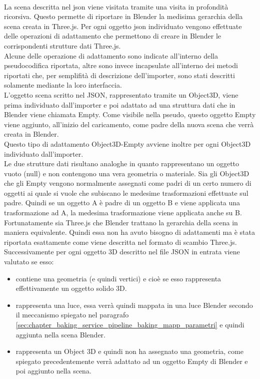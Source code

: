 \\
La scena descritta nel json viene visitata tramite una visita in profondità ricorsiva. 
Questo permette di riportare in Blender la medisima gerarchia della scena creata in Three.js.
Per ogni oggetto json individuato vengono effettuate delle operazioni di adattamento che permettono di creare in Blender le corrispondenti strutture dati Three.js.
\\
Alcune delle operazione di adattamento sono indicate all’interno della pseudocodifica riportata, altre sono invece incapsulate all’interno dei metodi riportati che, per semplifità di descrizione dell’importer, sono stati descritti solamente mediante la loro interfaccia.
\\
L’oggetto scena scritto nel JSON, rappresentato  tramite un Object3D, viene prima individuato dall’importer e poi  adattato ad una struttura dati che in Blender viene chiamata Empty. 
Come visibile nella pseudo, questo oggetto Empty viene aggiunto, all’inizio del caricamento, come padre della nuova scena che verrà creata in Blender.
\\
Questo tipo di adattamento Object3D-Empty avviene inoltre per ogni Object3D individuato dall’importer.
\\
Le due strutture dati risultano analoghe in quanto rappresentano un oggetto vuoto (null) e non contengono una vera geometria o materiale. Sia gli Object3D che gli Empty vengono normalmente assegnati come padri di un certo numero di oggetti ai quale si vuole che subiscano le medesime trasformazioni effettuate sul padre. Quindi se un oggetto A è padre di un oggetto B e viene applicata una trasformazione ad A, la medesima trasformazione viene applicata anche su B.
\\
Fortunatamente sia Three.js che Blender trattano la gerarchia della scena in maniera equivalente. Quindi essa non ha avuto bisogno di adattamenti ma è stata riportata esattamente come viene descritta nel formato di scambio Three.js.
\\
Successivamente per ogni oggetto 3D descritto nel file JSON in entrata viene valutato se esso:
\begin{itemize}
\item contiene una geometria (e quindi vertici) e cioè se esso rappresenta effettivamente un oggetto solido 3D.
\item rappresenta una luce, essa verrà quindi mappata in una luce Blender secondo il meccanismo spiegato nel paragrafo \ref{sec:chapter_baking_service_pipeline_baking_mapp_parametri} e quindi aggiunta nella scena Blender.
\item rappresenta un Object 3D e quindi non ha assegnato una geometria, come spiegato precedentemente verrà adattato ad un oggetto Empty di Blender e poi aggiunto nella scena.
\end{itemize}
